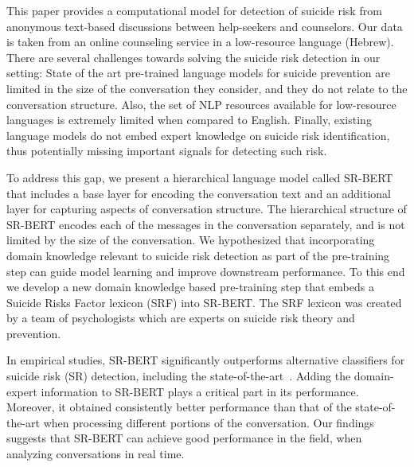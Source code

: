 \documentclass[letterpaper]{article} %
\newcommand{\kibitz}[2]{\ifnum\Comments=1{\textcolor{#1}{#2}}\fi}
\newcommand{\kg}[1]{\kibitz{red}{[KG:#1]}}
\begin{document}
 This paper provides a  computational model for detection of suicide risk from anonymous text-based discussions between help-seekers and counselors.  Our data is taken from an online counseling service in a low-resource language (Hebrew). There are several challenges towards solving the suicide risk detection in our setting:
 State of the art pre-trained language models for suicide prevention  are limited in the size of the conversation they consider, and they  do not relate to the conversation structure.
 Also, the set of NLP resources available for low-resource languages is extremely limited when compared to English. Finally, existing language models do not embed expert knowledge on suicide risk identification, thus potentially missing important signals for detecting such risk.

To address this gap, we present a hierarchical language model called SR-BERT that includes a base layer for encoding the conversation text and an additional layer for capturing aspects of conversation structure.
The hierarchical structure of SR-BERT  encodes  each of the messages in the conversation separately, and is not limited by the size of the conversation.
 We hypothesized that incorporating domain knowledge relevant to suicide risk detection as part of the pre-training step can guide model learning and improve downstream performance. To this end we develop a new domain knowledge based pre-training step that embeds a Suicide Risks Factor lexicon (SRF) into SR-BERT. The SRF lexicon was created by a team of psychologists which are experts on suicide risk theory and prevention.




In empirical studies, SR-BERT significantly outperforms alternative classifiers for suicide risk (SR) detection, including the state-of-the-art~\cite{amir}. Adding the domain-expert information to SR-BERT plays a critical part in its performance.  Moreover, it obtained consistently better performance  than that of the state-of-the-art when processing different portions of the conversation.
Our findings suggests that SR-BERT can achieve good performance in the field, when analyzing conversations in real time.
\end{document}
